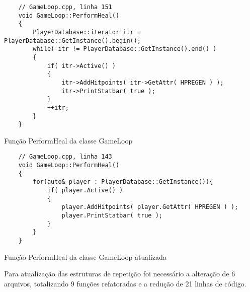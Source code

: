 \begin{listing}[!ht]
    \begin{verbatim}
    // GameLoop.cpp, linha 151
    void GameLoop::PerformHeal()
    {
        PlayerDatabase::iterator itr = PlayerDatabase::GetInstance().begin();
        while( itr != PlayerDatabase::GetInstance().end() )
        {
            if( itr->Active() )
            {
                itr->AddHitpoints( itr->GetAttr( HPREGEN ) );
                itr->PrintStatbar( true );
            }
            ++itr;
        }
    }
    \end{verbatim}
\caption{Função PerformHeal da classe GameLoop}
\label{lst:whileloop}
\end{listing}

\begin{listing}[!ht]
    \begin{verbatim}
    // GameLoop.cpp, linha 143
    void GameLoop::PerformHeal()
    {
        for(auto& player : PlayerDatabase::GetInstance()){
            if( player.Active() )
            {
                player.AddHitpoints( player.GetAttr( HPREGEN ) );
                player.PrintStatbar( true );
            }
        }
    }
    \end{verbatim}
\caption{Função PerformHeal da classe GameLoop atualizada}
\label{lst:rangebasedfor}
\end{listing}

Para atualização das estruturas de repetição foi necessário a alteração de 6 arquivos, totalizando
9 funções refatoradas e a redução de 21 linhas de código.
